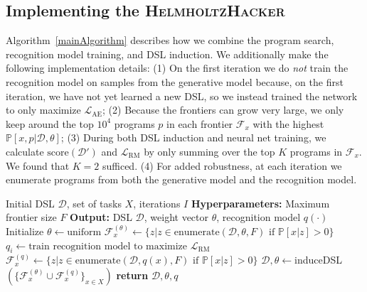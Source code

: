 \documentclass{article}
\newcommand{\system}{\textsc{HelmholtzHacker}~}
\newcommand{\probability}{\mathds{P}} %
\begin{document}
\subsection{Implementing the \system}

Algorithm~\ref{mainAlgorithm} describes how we combine the
program search, recognition model training, and DSL induction.
We additionally make the following implementation details:
(1) On the first iteration we do \emph{not} train the recognition model on samples from
the generative model because, on the first iteration, we have not yet learned a
new DSL, so we instead trained the network to only maximize $\mathcal{L}_{\text{AE}}$;
(2) Because the frontiers can grow very large,
we only keep around the top $10^4$ programs $p$ in each frontier $\mathcal{F}_x$
with the highest $\probability[x,p|\mathcal{D},\theta]$;
(3) During both DSL induction and neural net training, we calculate $\text{score}(\mathcal{D}')$ and $\mathcal{L}_{\text{RM}}$
by only summing over the top $K$
programs in $\mathcal{F}_x$.
We found that $K = 2$ sufficed.
(4) For added robustness, at each iteration we enumerate programs from both the generative model and the recognition model.

\begin{algorithm}[tb]
   \caption{The \system Algorithm}
   \label{mainAlgorithm}
   \begin{algorithmic}
      Initial DSL $\mathcal{D}$, set of tasks $X$, iterations $I$
     \STATE \textbf{Hyperparameters:} Maximum frontier size $F$
     \STATE \textbf{Output:} DSL $\mathcal{D}$, weight vector $\theta$, recognition model $q(\cdot)$
     \STATE Initialize $\theta\gets \text{uniform}$ %
     \STATE  $\mathcal{F}^{(\theta)}_x\gets \{z| z\in \text{enumerate}(\mathcal{D},\theta,F)\text{ if }\probability[x|z] > 0\}$
     \STATE $q_i\gets \text{train recognition model to maximize }\mathcal{L}_{\text{RM}}$
     \STATE  $\mathcal{F}^{(q)}_x\gets\{z|z\in \text{enumerate}(\mathcal{D},q(x),F)\text{ if }\probability[x|z] > 0\}$
     \STATE $\mathcal{D},\theta\gets $induceDSL$(\{\mathcal{F}^{(\theta)}_x\cup\mathcal{F}^{(q)}_x\}_{x\in X})$
      \ENDFOR
 \STATE \textbf{return} $\mathcal{D},\theta,q$
\end{algorithmic}
\end{algorithm}
\end{document}
